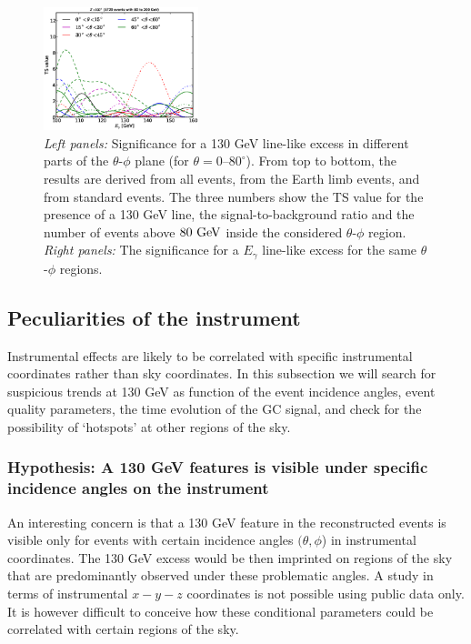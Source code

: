 \documentclass[aps,twocolumn,prd,superscriptaddress,showpacs,nofootinbib,fixfloat]{revtex4}
\newcommand{\GeV}{{\rm ~GeV}}
\begin{document}
\begin{figure}
  \includegraphics[width=0.40\textwidth]{plots/scan_z.LE.100.eps}
  \caption{\emph{Left panels:} Significance for a 130 GeV line-like excess in different parts of
  the $\theta$-$\phi$ plane (for $\theta=0$--$80^\circ$). From top to bottom,
  the results are derived from all events, from the Earth limb events, and
  from standard events. The three numbers
  show the TS value for the presence of a 130 GeV line, the
  signal-to-background ratio and the number of events above $80\GeV$ inside
  the considered $\theta$-$\phi$ region. \emph{Right panels:} The significance
  for a $E_\gamma$ line-like excess for the same $\theta$-$\phi$ regions.}
  \label{fig:polarPlotsAll}
\end{figure}


\subsection{Peculiarities of the instrument}
Instrumental effects are likely to be correlated with specific instrumental
coordinates rather than sky coordinates. In this subsection we will search for
suspicious trends at 130 GeV as function of the event incidence angles, event
quality parameters, the time evolution of the GC signal, and check for the
possibility of `hotspots' at other regions of the sky.

\subsubsection{Hypothesis: A 130 GeV features is visible under specific
incidence angles on the instrument}


An interesting concern is that a 130 GeV feature in the reconstructed events
is visible only for events with certain incidence angles $(\theta, \phi$) in
instrumental coordinates. The 130 GeV excess would be then imprinted on
regions of the sky that are predominantly observed under these problematic
angles. A study in terms of instrumental $x-y-z$ coordinates is not possible
using public data only. It is however difficult to conceive how these
conditional parameters could be correlated with certain regions of the sky.
\end{document}
